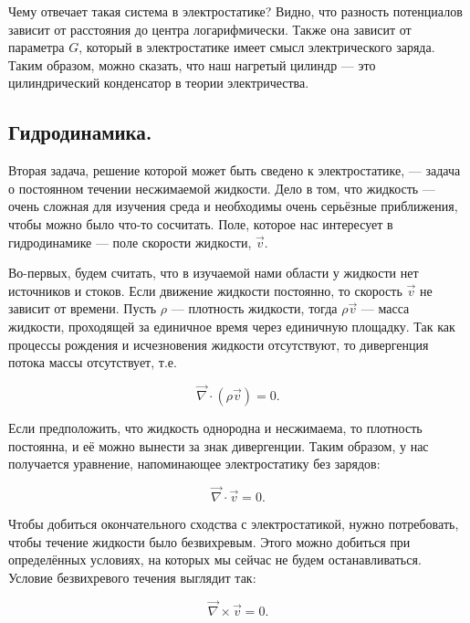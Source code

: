\documentclass[11pt,a4paper]{article}
\numberwithin{equation}{section}
\newcommand{\vn}{\vec{\nabla}}
\begin{document}
Чему отвечает такая система в электростатике? Видно, что разность
потенциалов зависит от расстояния до центра логарифмически. Также она
зависит от параметра $G$, который в электростатике имеет смысл
электрического заряда. Таким образом, можно сказать, что наш нагретый
цилиндр --- это цилиндрический конденсатор в теории электричества.

\subsection{Гидродинамика.}
\label{sec:hydro}

Вторая задача, решение которой может быть сведено к электростатике,
--- задача о постоянном течении несжимаемой жидкости. Дело в том, что
жидкость --- очень сложная для изучения среда и необходимы очень
серьёзные приближения, чтобы можно было что-то сосчитать. Поле,
которое нас интересует в гидродинамике --- поле скорости жидкости,
$\vec{v}$. 

Во-первых, будем считать, что в изучаемой нами области у жидкости нет
источников и стоков. Если движение жидкости постоянно, то скорость
$\vec{v}$ не зависит от времени. Пусть $\rho$ --- плотность жидкости,
тогда $\rho \vec{v}$ --- масса жидкости, проходящей за единичное время
через единичную площадку. Так как процессы рождения и исчезновения
жидкости отсутствуют, то дивергенция потока массы отсутствует, т.е.

\begin{equation}
  \label{eq:hydro_1}
  \vn \cdot (\rho \vec{v}) =0.
\end{equation}

Если предположить, что жидкость однородна и несжимаема, то плотность
постоянна, и её можно вынести за знак дивергенции. Таким образом, у
нас получается уравнение, напоминающее электростатику без зарядов: 

\begin{equation}
  \label{eq:hydro_2}
  \vn \cdot \vec{v} = 0.
\end{equation}

Чтобы добиться окончательного сходства с электростатикой, нужно
потребовать, чтобы течение жидкости было безвихревым. Этого можно
добиться при определённых условиях, на которых мы сейчас не будем
останавливаться. Условие безвихревого течения выглядит так: 

\begin{equation}
  \label{eq:hydro_3}
  \vn \times \vec{v} = 0.
\end{equation}
\end{document}
